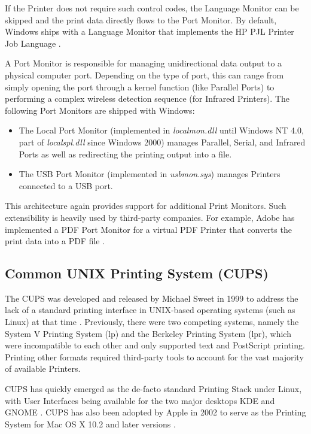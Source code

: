 If the Printer does not require such control codes, the Language Monitor can be skipped and the print data directly flows to the Port Monitor.
By default, Windows ships with a Language Monitor that implements the HP PJL Printer Job Language \cite{msdn2015langmonitors}.

A Port Monitor is responsible for managing unidirectional data output to a physical computer port.
Depending on the type of port, this can range from simply opening the port through a kernel function (like Parallel Ports) to performing a complex wireless detection sequence (for Infrared Printers).
The following Port Monitors are shipped with Windows:

\begin{itemize}
	\item The Local Port Monitor (implemented in \emph{localmon.dll} until Windows NT 4.0, part of \emph{localspl.dll} since Windows 2000) manages Parallel, Serial, and Infrared Ports as well as redirecting the printing output into a file.
	\item The USB Port Monitor (implemented in \emph{usbmon.sys}) manages Printers connected to a \gls{USB} port.
\end{itemize}

This architecture again provides support for additional Print Monitors.
Such extensibility is heavily used by third-party companies.
For example, Adobe has implemented a \gls{PDF} Port Monitor for a virtual \gls{PDF} Printer that converts the print data into a \gls{PDF} file \cite{adobe2015printerproperties}.


\subsection{Common UNIX Printing System (CUPS)}
The \gls{CUPS} was developed and released by Michael Sweet in 1999 to address the lack of a standard printing interface in UNIX-based operating systems (such as Linux) at that time \cite{sweet1999cups}.
Previously, there were two competing systems, namely the System V Printing System (lp) and the Berkeley Printing System (lpr), which were incompatible to each other and only supported text and PostScript printing.
Printing other formats required third-party tools to account for the vast majority of available Printers.

\gls{CUPS} has quickly emerged as the de-facto standard Printing Stack under Linux, with User Interfaces being available for the two major desktops KDE and GNOME \cite{pfeifle2001kdeprint} \cite{burton2003gnome}.
\gls{CUPS} has also been adopted by Apple in 2002 to serve as the Printing System for Mac OS X 10.2 and later versions \cite{esp2002applecups}.


